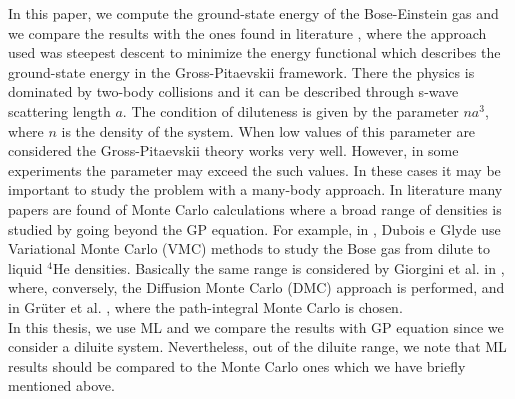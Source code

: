 In this paper, we compute the ground-state energy of the Bose-Einstein gas and we compare the results with the ones found in literature \cite{DalfString}, where the approach used was steepest descent to minimize the energy functional which describes the ground-state energy in the Gross-Pitaevskii framework. There the physics is dominated by two-body collisions and it can be described through s-wave scattering length $a$. The condition of diluteness is given by the parameter $na^3$, where $n$ is the density of the system. When low values of this parameter are considered the Gross-Pitaevskii theory works very well. However, in some experiments the parameter may exceed the such values. In these cases it may be important to study the problem with a many-body approach. In literature many papers are found of Monte Carlo calculations where a broad range of densities is studied by going beyond the GP equation. For example, in \cite{vmcarticle}, Dubois e Glyde use Variational Monte Carlo (VMC) methods to study the Bose gas from dilute to liquid $^4$He densities. Basically the same range is considered by Giorgini et al. in \cite{Giorgini}, where, conversely, the Diffusion Monte Carlo (DMC) approach is performed, and in Gr\"{u}ter et al. \cite{Gruter}, where the path-integral Monte Carlo is chosen. \\
In this thesis, we use ML and we compare the results with GP equation since we consider a diluite system. Nevertheless, out of the diluite range, we note that ML results should be compared to the Monte Carlo ones which we have briefly mentioned above. 





 

